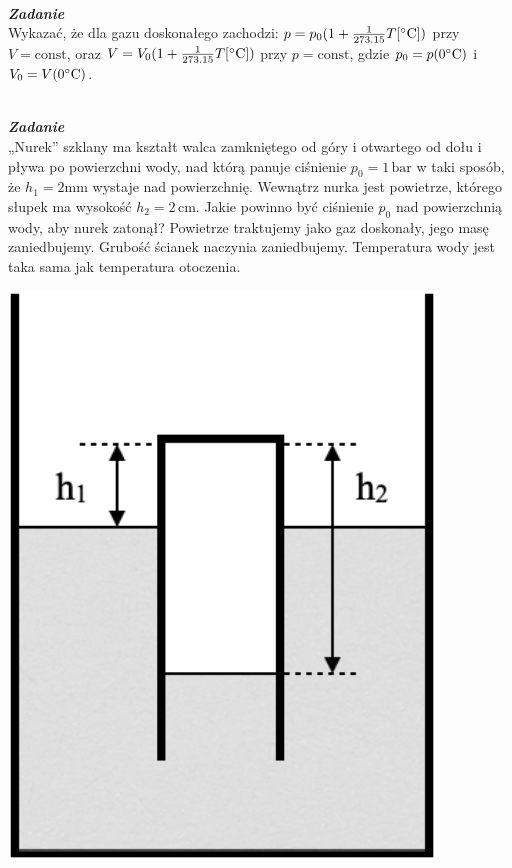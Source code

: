 \documentclass[11pt,a4paper]{article}
\newcounter{zadanie}\newcommand{\zadanie}[1][]{\addtocounter{zadanie}{1} ~\\  {\bf \emph{Zadanie \arabic{zadanie} #1 }} \\}
\begin{document}
\zadanie
Wykazać, że dla gazu doskonałego zachodzi: $p = p_0 (1 + \frac{1}{273.15} T[\degree \textrm{C}])$ przy $V = \textrm{const}$,
oraz $V = V_0 (1+ \frac{1}{273.15}  T[\degree \textrm{C}])$ przy $p=\textrm{const}$, gdzie $p_0 =p(0\degree \textrm{C})$ i $V_0 =V(0\degree \textrm{C})$.

\vfill

\begin{minipage}{0.75\textwidth}
\zadanie
„Nurek” szklany ma kształt walca zamkniętego od góry i otwartego od dołu i pływa po powierzchni wody, nad którą panuje ciśnienie $p_0 = 1\,\textrm{bar}$ w taki sposób, że $h_1 = 2\textrm{mm}$ wystaje nad powierzchnię. Wewnątrz nurka jest powietrze, którego słupek ma wysokość $h_2 = 2\,\textrm{cm}$.
Jakie powinno być ciśnienie $p_0$ nad powierzchnią wody, aby nurek zatonął? Powietrze traktujemy jako gaz doskonały, jego masę zaniedbujemy. Grubość ścianek naczynia zaniedbujemy. Temperatura wody jest taka sama jak temperatura otoczenia.
\phantom{.} \\
\end{minipage}
\begin{minipage}{0.25\textwidth}
\begin{center}

\includegraphics[width=0.85\textwidth]{zadanie8.png}
\end{center}
\end{minipage}
\end{document}
